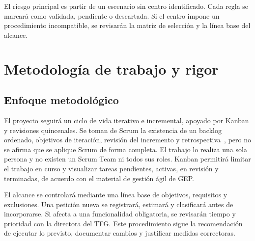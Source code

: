 El riesgo principal es partir de un escenario sin centro identificado. Cada regla se marcará como validada, pendiente o descartada. Si el centro impone un procedimiento incompatible, se revisarán la matriz de selección y la línea base del alcance.

\section{Metodología de trabajo y rigor}\label{sec:1-4}

\subsection{Enfoque metodológico}\label{sec:1-4-1}

El proyecto seguirá un ciclo de vida iterativo e incremental, apoyado por Kanban y revisiones quincenales. Se toman de Scrum la existencia de un backlog ordenado, objetivos de iteración, revisión del incremento y retrospectiva~\cite{ref13}, pero no se afirma que se aplique Scrum de forma completa. El trabajo lo realiza una sola persona y no existen un Scrum Team ni todos sus roles. Kanban permitirá limitar el trabajo en curso y visualizar tareas pendientes, activas, en revisión y terminadas, de acuerdo con el material de gestión ágil de GEP.

El alcance se controlará mediante una línea base de objetivos, requisitos y exclusiones. Una petición nueva se registrará, estimará y clasificará antes de incorporarse. Si afecta a una funcionalidad obligatoria, se revisarán tiempo y prioridad con la directora del TFG. Este procedimiento sigue la recomendación de ejecutar lo previsto, documentar cambios y justificar medidas correctoras.

